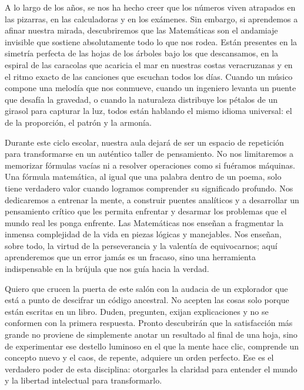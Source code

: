 \documentclass[11pt]{report}
\begin{document}
\begin{titlepage}
A lo largo de los años, se nos ha hecho creer que los números viven atrapados en las pizarras, en las calculadoras y en los exámenes. Sin embargo, si aprendemos a afinar nuestra mirada, descubriremos que las Matemáticas son el andamiaje invisible que sostiene absolutamente todo lo que nos rodea. Están presentes en la simetría perfecta de las hojas de los árboles bajo los que descansamos, en la espiral de las caracolas que acaricia el mar en nuestras costas veracruzanas y en el ritmo exacto de las canciones que escuchan todos los días. Cuando un músico compone una melodía que nos conmueve, cuando un ingeniero levanta un puente que desafía la gravedad, o cuando la naturaleza distribuye los pétalos de un girasol para capturar la luz, todos están hablando el mismo idioma universal: el de la proporción, el patrón y la armonía.

\vspace{0.7em}

Durante este ciclo escolar, nuestra aula dejará de ser un espacio de repetición para transformarse en un auténtico taller de pensamiento. No nos limitaremos a memorizar fórmulas vacías ni a resolver operaciones como si fuéramos máquinas. Una fórmula matemática, al igual que una palabra dentro de un poema, solo tiene verdadero valor cuando logramos comprender su significado profundo. Nos dedicaremos a entrenar la mente, a construir puentes analíticos y a desarrollar un pensamiento crítico que les permita enfrentar y desarmar los problemas que el mundo real les ponga enfrente. Las Matemáticas nos enseñan a fragmentar la inmensa complejidad de la vida en piezas lógicas y manejables. Nos enseñan, sobre todo, la virtud de la perseverancia y la valentía de equivocarnos; aquí aprenderemos que un error jamás es un fracaso, sino una herramienta indispensable en la brújula que nos guía hacia la verdad.

\vspace{0.7em}

Quiero que crucen la puerta de este salón con la audacia de un explorador que está a punto de descifrar un código ancestral. No acepten las cosas solo porque están escritas en un libro. Duden, pregunten, exijan explicaciones y no se conformen con la primera respuesta. Pronto descubrirán que la satisfacción más grande no proviene de simplemente anotar un resultado al final de una hoja, sino de experimentar ese destello luminoso en el que la mente hace clic, comprende un concepto nuevo y el caos, de repente, adquiere un orden perfecto. Ese es el verdadero poder de esta disciplina: otorgarles la claridad para entender el mundo y la libertad intelectual para transformarlo.


\end{titlepage}
\end{document}
